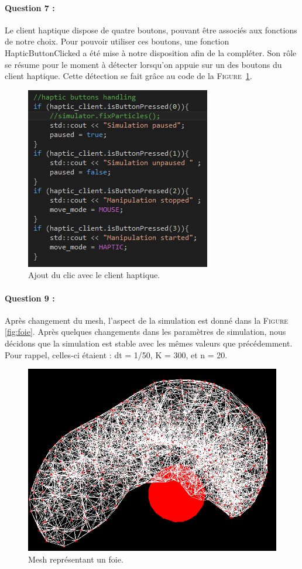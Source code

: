 \documentclass[a4paper,12pt]{article}
\begin{document}
\paragraph{Question 7 :} Le client haptique dispose de quatre boutons, pouvant être associés aux fonctions de notre choix. Pour pouvoir utiliser ces boutons, une fonction \og{}HapticButtonClicked\fg{} a été mise à notre disposition afin de la compléter. Son rôle se résume pour le moment à détecter lorsqu'on appuie sur un des boutons du client haptique. Cette détection se fait grâce au code de la \textsc{Figure}~\ref{fig:clic}.
\begin{figure}
  \centering
  \includegraphics{images/haptic_buttons.png}
  \caption{Ajout du clic avec le client haptique.}
  \label{fig:clic}
\end{figure}

\paragraph{Question 9 :} Après changement du mesh, l'aspect de la simulation est donné dans la \textsc{Figure} \ref{fig:foie}. Après quelques changements dans les paramètres de simulation, nous décidons que la simulation est stable avec les mêmes valeurs que précédemment. Pour rappel, celles-ci étaient : dt = 1/50, K = 300, et n = 20.
\begin{figure}
  \centering
  \includegraphics{images/foie.png}
  \caption{Mesh représentant un foie.}
  \label{fig:}
\end{figure}
\end{document}
